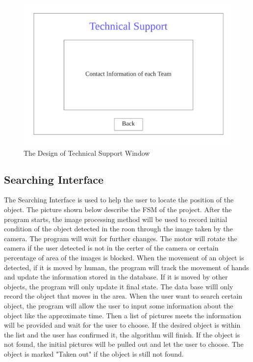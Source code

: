 \documentclass[12pt, titlepage]{article}
\begin{document}
\begin{figure}[H]
    \centering
    \includegraphics[scale=0.8]{Technical.png}
    \caption{The Design of Technical Support Window}
\end{figure}

\subsection{Searching Interface}

The Searching Interface is used to help the user to locate the position of the object. The picture shown below describe the FSM of the project. After the program starts, the image processing method will be used to record initial condition of the object detected in the roon through the image taken by the camera. The program will wait for further changes. The motor will rotate the camera if the user detected is not in the certer of the camera or certain percentage of area of the images is blocked. When the movement of an object is detected, if it is moved by human, the program will track the movement of hands and update the information stored in the database. If it is moved by other objects, the program will only update it final state. The data base willl only record the object that moves in the area. When the user want to search certain object, the program will allow the user to input some information about the object like the approximate time. Then a list of pictures meets the information will be provided and wait for the user to choose. If the desired object is within the list and the user has confirmed it, the algorithm will finish. If the object is not found, the initial pictures will be pulled out and let the user to choose. The object is marked "Taken out" if the object is still not found. 
\end{document}
